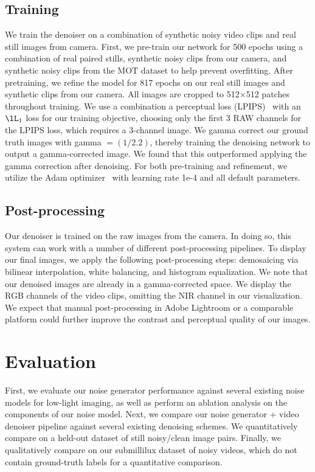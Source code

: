 \documentclass[final]{cvpr}
\begin{document}
\subsection{Training}
We train the denoiser on a combination of synthetic noisy video clips and real still images from camera. First, we pre-train our network for 500 epochs using a combination of real paired stills, synthetic noisy clips from our camera, and synthetic noisy clips from the MOT dataset to help prevent overfitting. After pretraining, we refine the model for 817 epochs on our real still images and synthetic clips from our camera. All images are cropped to 512$\times$512 patches throughout training. We use a combination a perceptual loss (LPIPS)~\cite{zhang2018unreasonable} with an $\lL_1$ loss for our training objective, choosing only the first 3 RAW channels for the LPIPS loss, which requires a 3-channel image. We gamma correct our ground truth images with gamma $=(1/2.2)$, thereby training the denoising network to output a gamma-corrected image. We found that this outperformed applying the gamma correction after denoising. For both pre-training and refinement, we utilize the Adam optimizer~\cite{kingma2014adam} with learning rate 1e-4 and all default parameters. 

\subsection{Post-processing}
Our denoiser is trained on the raw images from the camera. In doing so, this system can work with a number of different post-processing pipelines. To display our final images, we apply the following post-processing steps: demosaicing via bilinear interpolation, white balancing, and histogram equalization. We note that our denoised images are already in a gamma-corrected space. We display the RGB channels of the video clips, omitting the NIR channel in our visualization. We expect that manual post-processing in Adobe Lightroom or a comparable platform could further improve the contrast and perceptual quality of our images.


\section{Evaluation}
\label{sec:results}
First, we evaluate our noise generator performance against several existing noise models for low-light imaging, as well as perform an ablation analysis on the components of our noise model. Next, we compare our noise generator + video denoiser pipeline against several existing denoising schemes. We quantitatively compare on a held-out dataset of still noisy/clean image pairs. Finally, we qualitatively compare on our submillilux dataset of noisy videos, which do not contain ground-truth labels for a quantitative comparison. 
\end{document}
